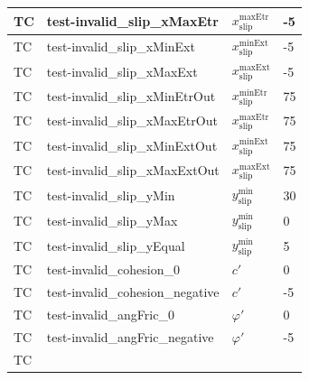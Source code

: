 \documentclass[12pt, titlepage]{article}
\newcounter{testnum} %
\begin{document}
\begin{longtable}{  l  p{5cm}  l  p{5cm}  }
	\hline
	TC{testnum}\thetestnum \label{TC_InvalidSlipXMaxEtr} & 
	test-invalid\_slip\_xMaxEtr & ${x_\text{slip}^\text{maxEtr}}$ & -5\\ 
	\hline
	TC{testnum}\thetestnum \label{TC_InvalidSlipXMinExt} & 
	test-invalid\_slip\_xMinExt & ${x_\text{slip}^\text{minExt}}$ & -5\\ 
	\hline
	TC{testnum}\thetestnum \label{TC_InvalidSlipXMaxExt} & 
	test-invalid\_slip\_xMaxExt & ${x_\text{slip}^\text{maxExt}}$ & -5\\ 
	\hline
	TC{testnum}\thetestnum \label{TC_InvalidSlipXMinEtrOut} & 
	test-invalid\_slip\_xMinEtrOut & ${x_\text{slip}^\text{minEtr}}$ & 75\\ 
	\hline
	TC{testnum}\thetestnum \label{TC_InvalidSlipXMaxEtrOut} & 
	test-invalid\_slip\_xMaxEtrOut & ${x_\text{slip}^\text{maxEtr}}$ & 75\\ 
	\hline
	TC{testnum}\thetestnum \label{TC_InvalidSlipXMinExtOut} & 
	test-invalid\_slip\_xMinExtOut & ${x_\text{slip}^\text{minExt}}$ & 75\\ 
	\hline
	TC{testnum}\thetestnum \label{TC_InvalidSlipXMaxExtOut} & 
	test-invalid\_slip\_xMaxExtOut & ${x_\text{slip}^\text{maxExt}}$ & 75\\ 
	\hline
	TC{testnum}\thetestnum \label{TC_InvalidSlipYMin} & 
	test-invalid\_slip\_yMin & ${y_\text{slip}^\text{min}}$ & 30\\ 
	\hline
	TC{testnum}\thetestnum \label{TC_InvalidSlipYMax} & 
	test-invalid\_slip\_yMax & ${y_\text{slip}^\text{min}}$ & 0\\ 
	\hline
	TC{testnum}\thetestnum \label{TC_InvalidSlipYEqual} & 
	test-invalid\_slip\_yEqual & ${y_\text{slip}^\text{min}}$ & 5\\ 
	\hline
	TC{testnum}\thetestnum \label{TC_InvalidCohesion0} & 
	test-invalid\_cohesion\_0 & $c'$ & 0\\ 
	\hline
	TC{testnum}\thetestnum \label{TC_InvalidCohesionNegative} & 
	test-invalid\_cohesion\_negative & $c'$ & -5\\ 
	\hline
	TC{testnum}\thetestnum \label{TC_InvalidAngFric0} & 
	test-invalid\_angFric\_0 & $\varphi'$ & 0\\ 
	\hline
	TC{testnum}\thetestnum \label{TC_InvalidAngFricNegative} & 
	test-invalid\_angFric\_negative & $\varphi'$ & -5\\ 
	\hline
	TC{testnum}\thetestnum \label{TC_InvalidAngFric90} & 

\end{longtable}
\end{document}
